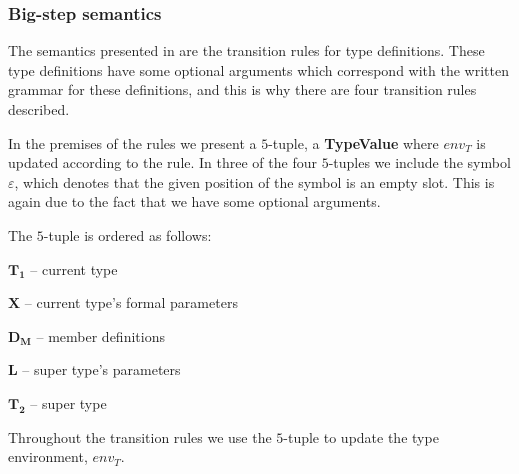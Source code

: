 \subsubsection{Big-step semantics}

The semantics presented in  are the transition rules
for type definitions.  These type definitions have some optional arguments which
correspond with the written grammar for these definitions, and this is why there
are four transition rules described.



In the premises of the rules we present a $5$-tuple, a
\textbf{TypeValue} where $env_{T}$ is updated according to the rule. In
three of the four $5$-tuples we include the symbol $\varepsilon$, which
denotes that the given position of the symbol is an empty slot. This is
again due to the fact that we have some optional arguments.

The $5$-tuple is ordered as follows:

\begin{nlist}
\item $\mathbf{T_{1}}$ -- current type
  \item $\mathbf{X}$ -- current type's formal parameters
  \item $\mathbf{D_{M}}$ -- member definitions
  \item $\mathbf{L}$ -- super type's parameters
  \item $\mathbf{T_{2}}$ -- super type
\end{nlist}

Throughout the transition rules we use the $5$-tuple to update the type
environment, $env_T$.
